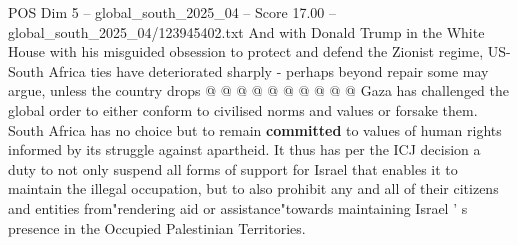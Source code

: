 \begin{textsample}{POS Dim 5 – global\_south\_2025\_04 – Score 17.00 – global\_south\_2025\_04/123945402.txt}
And with Donald Trump in the White House with his misguided obsession to protect and defend the Zionist regime, US-South Africa ties have deteriorated sharply - perhaps beyond repair some may argue, unless the country drops @ @ @ @ @ @ @ @ @ @ Gaza has challenged the global order to either conform to civilised norms and values or forsake them.
South Africa has no choice but to remain \textbf{committed} to values of human rights informed by its struggle against apartheid.
It thus has per the ICJ decision a duty to not only suspend all forms of support for Israel that enables it to maintain the illegal occupation, but to also prohibit any and all of their citizens and entities from"rendering aid or assistance"towards maintaining Israel ' s presence in the Occupied Palestinian Territories.

\end{textsample}

